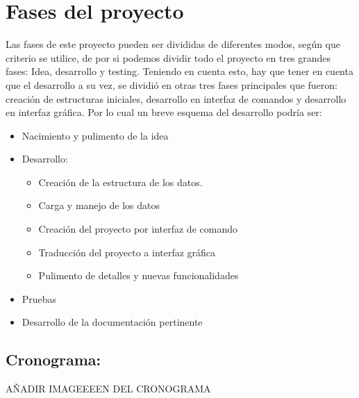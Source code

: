 \section{Fases del proyecto}
Las fases de este proyecto pueden ser divididas de diferentes modos, según que criterio se utilice, de por si podemos dividir todo el proyecto en tres grandes fases: Idea, desarrollo y testing. Teniendo en cuenta esto, hay que tener en cuenta que el desarrollo a su vez, se dividió en otras tres fases principales que fueron: creación de estructuras iniciales, desarrollo en interfaz de comandos y desarrollo en interfaz gráfica. 
Por lo cual un breve esquema del desarrollo podría ser:
\begin{itemize}
\item Nacimiento y pulimento de la idea
\item Desarrollo:
\begin{itemize}
\item Creación de la estructura de los datos.
\item Carga y manejo de los datos
\item Creación del proyecto por interfaz de comando
\item Traducción del proyecto a interfaz gráfica
\item Pulimento de detalles y nuevas funcionalidades
\end{itemize}
\item Pruebas
\item Desarrollo de la documentación pertinente
\end{itemize}
\subsection{Cronograma: }
AÑADIR IMAGEEEEN DEL CRONOGRAMA